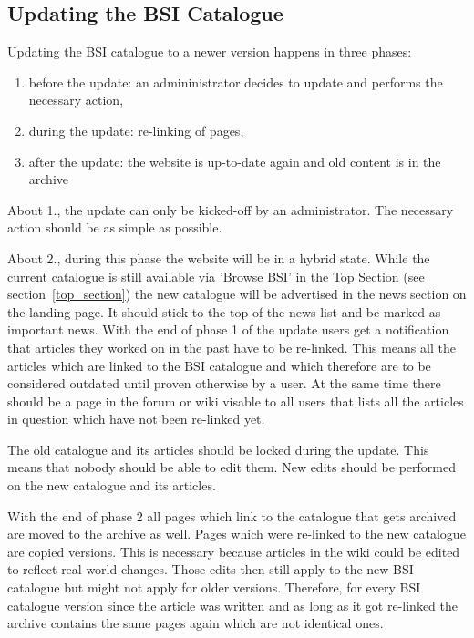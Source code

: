 \subsection{Updating the BSI Catalogue}
\begin{tcolorbox}[breakable,colback=red!14,colframe=red!40!black,title=UPDATE 19/11/2017]
Updating the BSI catalogue to a newer version happens in three phases:
\begin{enumerate}
    \item before the update: an admininistrator decides to update and performs the necessary action,
    \item during the update: re-linking of pages,
    \item after the update: the website is up-to-date again and old content is in the archive 
\end{enumerate}

About 1., the update can only be kicked-off by an administrator.
The necessary action should be as simple as possible. 

\bigskip

About 2., during this phase the website will be in a hybrid state.
While the current catalogue is still available via 'Browse BSI' in the Top Section (see section~\ref{top_section}) the new catalogue will be advertised in the news section on the landing page.
It should stick to the top of the news list and be marked as important news.
With the end of phase 1 of the update users get a notification that articles they worked on in the past have to be re-linked.
This means all the articles which are linked to the BSI catalogue and which therefore are to be considered outdated until proven otherwise by a user.
At the same time there should be a page in the forum or wiki visable to all users that lists all the articles in question which have not been re-linked yet.
\begin{tcolorbox}[breakable,colback=red!18,colframe=red!40!black,title=UPDATE 04/12/2017]
The old catalogue and its articles should be locked during the update. 
This means that nobody should be able to edit them.
New edits should be performed on the new catalogue and its articles.
\end{tcolorbox}
With the end of phase 2 all pages which link to the catalogue that gets archived are moved to the archive as well.
Pages which were re-linked to the new catalogue are copied versions.
This is necessary because articles in the wiki could be edited to reflect real world changes. 
Those edits then still apply to the new BSI catalogue but might not apply for older versions.
Therefore, for every BSI catalogue version since the article was written and as long as it got re-linked the archive contains the same pages again which are not identical ones.
\medskip


\end{tcolorbox}
